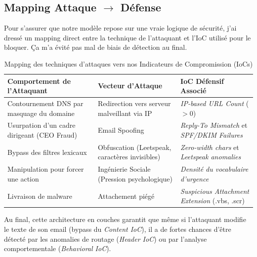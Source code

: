 \subsection{Mapping Attaque $\rightarrow$ Défense}

Pour s'assurer que notre modèle repose sur une vraie logique de sécurité, j'ai dressé un mapping direct entre la technique de l'attaquant et l'IoC utilisé pour le bloquer. Ça m'a évité pas mal de biais de détection au final.

\begin{table}[h]
\centering
\renewcommand{\arraystretch}{1.3}
\begin{tabular}{|p{4.5cm}|p{4.5cm}|p{5.5cm}|}
\hline
\textbf{Comportement de l'Attaquant} & \textbf{Vecteur d'Attaque} & \textbf{IoC Défensif Associé} \\ \hline
Contournement DNS par masquage du domaine & Redirection vers serveur malveillant via IP & \textit{IP-based URL Count} ($>0$) \\ \hline
Usurpation d'un cadre dirigeant (CEO Fraud) & Email Spoofing & \textit{Reply-To Mismatch} et \textit{SPF/DKIM Failures} \\ \hline
Bypass des filtres lexicaux & Obfuscation (Leetspeak, caractères invisibles) & \textit{Zero-width chars} et \textit{Leetspeak anomalies} \\ \hline
Manipulation pour forcer une action & Ingénierie Sociale (Pression psychologique) & \textit{Densité du vocabulaire d'urgence} \\ \hline
Livraison de malware & Attachement piégé & \textit{Suspicious Attachment Extension} (.vbs, .scr) \\ \hline
\end{tabular}
\caption{Mapping des techniques d'attaques vers nos Indicateurs de Compromission (IoCs)}
\label{tab:attack_defense_mapping}
\end{table}

Au final, cette architecture en couches garantit que même si l'attaquant modifie le texte de son email (bypass du \textit{Content IoC}), il a de fortes chances d'être détecté par les anomalies de routage (\textit{Header IoC}) ou par l'analyse comportementale (\textit{Behavioral IoC}).
